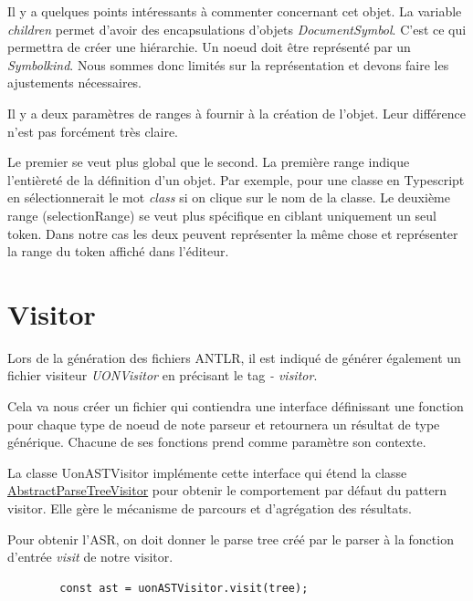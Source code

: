 \documentclass[
    iict, %
    il, %
]{heig-tb}
\begin{document}
Il y a quelques points intéressants à commenter concernant cet objet.
La variable \emph{children} permet d'avoir des encapsulations d'objets \emph{DocumentSymbol}. C'est ce qui permettra de créer une hiérarchie.
Un noeud doit être représenté par un \emph{Symbolkind}. Nous sommes donc limités sur la représentation et devons faire les ajustements nécessaires.

Il y a deux paramètres de ranges à fournir à la création de l'objet. Leur différence n'est pas forcément très claire.

Le premier se veut plus global que le second.
La première range indique l'entièreté de la définition d'un objet. Par exemple, pour une classe en Typescript en sélectionnerait le mot \emph{class} si on clique sur le nom de la classe.
Le deuxième range (selectionRange) se veut plus spécifique en ciblant uniquement un seul token.
Dans notre cas les deux peuvent représenter la même chose et représenter la range du token affiché dans l'éditeur.

\section{Visitor}

Lors de la génération des fichiers ANTLR, il est indiqué de générer également un fichier visiteur \emph{UONVisitor} en précisant le tag \emph{- visitor}.

Cela va nous créer un fichier qui contiendra une interface définissant une fonction pour chaque type de noeud de note parseur et retournera un résultat de type générique.
Chacune de ses fonctions prend comme paramètre son contexte.

La classe UonASTVisitor implémente cette interface qui étend la classe \href{https://www.antlr.org/api/Java/org/antlr/v4/runtime/tree/AbstractParseTreeVisitor.html}{AbstractParseTreeVisitor}
pour obtenir le comportement par défaut du pattern visitor. Elle gère le mécanisme de parcours et d’agrégation des résultats.

Pour obtenir l'ASR, on doit donner le parse tree créé par le parser à la fonction d'entrée \emph{visit} de notre visitor.

\begin{listing}[!ht]
    \begin{verbatim}
        const ast = uonASTVisitor.visit(tree);
    \end{verbatim}
\end{listing}
\end{document}
